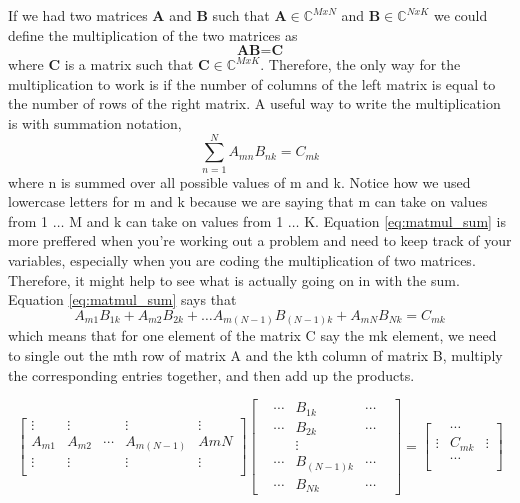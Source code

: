 \documentclass{article}
\newcommand{\be}{\begin{equation}}
\newcommand{\ee}{\end{equation}}
\begin{document}
If we had two matrices \textbf{A} and \textbf{B} such that $\textbf{A} \in \mathbb{C}^{MxN}$ and $\textbf{B} \in \mathbb{C}^{NxK}$ we could define the multiplication of the two matrices as
\be \label{eq:matmul}
  \textbf{A} \textbf{B} = \textbf{C}
\ee
where \textbf{C} is a matrix such that $\textbf{C} \in \mathbb{C}^{MxK}$.
Therefore, the only way for the multiplication to work is if the number of columns of the left matrix is equal to the number of rows of the right matrix.
A useful way to write the multiplication is with summation notation,
\be \label{eq:matmul_sum}
  \sum\limits_{n=1}^{N} A_{mn} B_{nk} = C_{mk}
\ee
where n is summed over all possible values of m and k.
Notice how we used lowercase letters for m and k because we are saying that m can take on values from 1 $\hdots$ M and k can take on values from 1 $\hdots$ K.
Equation \ref{eq:matmul_sum} is more preffered when you're working out a problem and need to keep track of your variables, especially when you are coding the multiplication of two matrices.
Therefore, it might help to see what is actually going on in with the sum.
Equation \ref{eq:matmul_sum} says that
\be
  A_{m1} B_{1k} + A_{m2} B_{2k} + \hdots A_{m(N-1)} B_{(N-1)k} + A_{mN} B_{Nk} = C_{mk}
\ee
which means that for one element of the matrix C say the mk element, we need to single out the mth row of matrix A and the kth column of matrix B, multiply the corresponding entries together, and then add up the products.

\[
\begin{bmatrix}
  \vdots & \vdots & & \vdots & \vdots \\
  A_{m1} & A_{m2} & \cdots & A_{m(N-1)} & A{mN} \\
  \vdots & \vdots & & \vdots & \vdots \\
\end{bmatrix}
\begin{bmatrix}
  & \cdots & B_{1k} & \cdots & \\
  & \cdots & B_{2k} & \cdots & \\
  & & \vdots & & \\
  & \cdots & B_{(N-1)k} & \cdots & \\
  & \cdots & B_{Nk} & \cdots &
\end{bmatrix}
=
\begin{bmatrix}
   & \cdots & \\
  \vdots & C_{mk} & \vdots \\
   & \cdots & \\
\end{bmatrix}
\]
\end{document}
